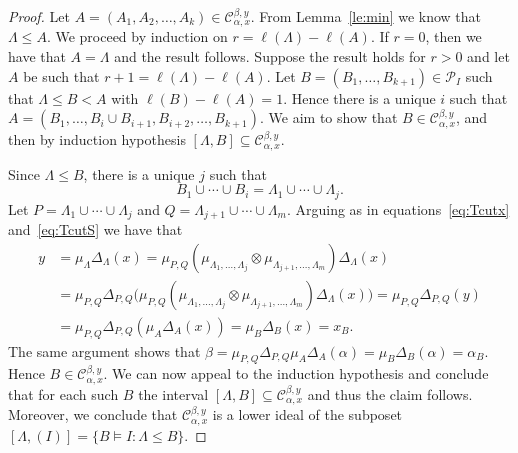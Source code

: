 \documentclass[ALCO,ThmDefs,Unicode,epreuves]{cedram}
\begin{document}
\begin{proof} Let $A=(A_1,A_2,\ldots,A_k)\in \mathcal{C}_{\alpha,x}^{\beta,y}$. From Lemma~\ref{le:min} we know that $\Lambda\le A$. We proceed by induction on $r = \ell(\Lambda)-\ell(A)$.
If $r=0$, then we have that $A=\Lambda$ and the result follows.
Suppose the result holds for $r>0$ and let $A$ be such that $r+1= \ell(\Lambda)-\ell(A)$. Let $B=(B_1,\dots,B_{k+1})\in \mathcal{P}_I$ such that $\Lambda\leq B< A$ with $\ell(B)-\ell(A)=1$. Hence there is a unique $i$ such that $A=(B_1,\ldots,B_i\cup B_{i+1},B_{i+2},\ldots,B_{k+1})$. We aim to show that $B\in\mathcal{C}_{\alpha,x}^{\beta,y}$, and then by induction hypothesis $[\Lambda,B]\subseteq \mathcal{C}_{\alpha,x}^{\beta,y}$. 

Since $\Lambda\le B$, there is a unique $j$ such that 
 $$ B_1\cup\cdots\cup B_i=\Lambda_1\cup\cdots\cup \Lambda_j.$$
Let $P=\Lambda_1\cup\cdots\cup \Lambda_j$ and $Q=\Lambda_{j+1}\cup\cdots\cup \Lambda_m$. Arguing as in equations~\eqref{eq:Tcutx} and~\eqref{eq:TcutS} we have that 
 $$
 \begin{aligned}
 y&=\mu_\Lambda\Delta_\Lambda(x)=\mu_{P,Q}(\mu_{\Lambda_1,\ldots, \Lambda_j}\otimes \mu_{\Lambda_{j+1},\ldots, \Lambda_m})\Delta_\Lambda(x)\\
 &=\mu_{P,Q}\Delta_{P,Q}\big(\mu_{P,Q}(\mu_{\Lambda_1,\ldots, \Lambda_j}\otimes \mu_{\Lambda_{j+1},\ldots, \Lambda_m})\Delta_\Lambda(x)\big)
 =\mu_{P,Q}\Delta_{P,Q}(y)\\
 &=\mu_{P,Q}\Delta_{P,Q}(\mu_A\Delta_A(x))= \mu_B\Delta_B(x)=x_B.
 \end{aligned}
 $$
 The same argument shows that $\beta=\mu_{P,Q}\Delta_{P,Q}\mu_A\Delta_A(\alpha)= \mu_B\Delta_B(\alpha)=\alpha_B$. Hence $B\in \mathcal{C}_{\alpha,x}^{\beta,y}$. We can now appeal to the induction hypothesis and conclude that for each such $B$ the interval $[\Lambda,B]\subseteq \mathcal{C}_{\alpha,x}^{\beta,y}$ and thus the claim follows. Moreover, we conclude that $\mathcal{C}_{\alpha,x}^{\beta,y}$ is a lower ideal of the subposet
 $[\Lambda,(I)]=\{B\models I : \Lambda \le B\}$.
\end{proof}
\end{document}
